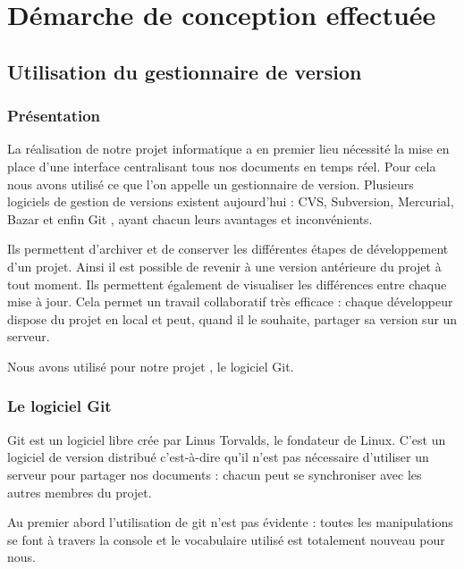 \chapter{D\'emarche de conception effectu\'ee}
\label{chap:outils utilises}

\section{Utilisation du gestionnaire de version }
\subsection{Pr\'esentation}
La r\'ealisation de notre projet informatique a en premier lieu n\'ecessit\'e la mise en place d'une interface centralisant tous nos
documents en temps r\'eel. Pour cela nous avons utilis\'e ce que l'on appelle un gestionnaire de version. Plusieurs logiciels de gestion 
de versions existent aujourd'hui : CVS, Subversion, Mercurial, Bazar et enfin Git \cite{git}, ayant chacun leurs avantages et inconv\'enients. 

Ils permettent d'archiver et de conserver les diff\'erentes \'etapes de d\'eveloppement d'un projet. Ainsi il est possible de revenir
\`a une version ant\'erieure du projet \`a tout moment. Ils permettent \'egalement de visualiser les diff\'erences entre chaque mise \`a jour. Cela permet un  
travail collaboratif tr\`es efficace : chaque d\'eveloppeur dispose du projet en local et peut, quand il le souhaite, partager sa version sur un serveur.

Nous avons utilis\'e pour notre projet \citep{projet11efr}, le logiciel Git.

\subsection{Le logiciel Git}
Git est un logiciel libre cr\'ee par Linus Torvalds, le fondateur de Linux. C'est un logiciel de version distribu\'e c'est-\`a-dire qu'il n'est
 pas n\'ecessaire d'utiliser un serveur pour partager nos documents : chacun peut se synchroniser avec les autres membres du projet.

Au premier abord l'utilisation de git n'est pas \'evidente : toutes les manipulations se font \`a travers la console et le vocabulaire utilis\'e 
est totalement nouveau pour nous. 

